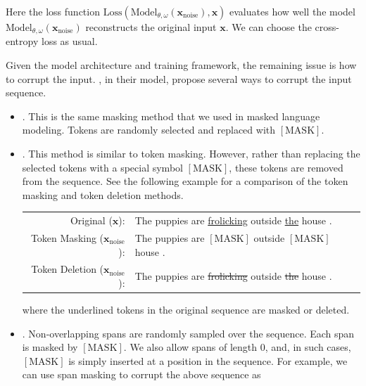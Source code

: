 \noindent Here the loss function $\mathrm{Loss}(\mathrm{Model}_{\theta,\omega}(\mathbf{x}_{\mathrm{noise}}),\mathbf{x})$ evaluates how well the model $\mathrm{Model}_{\theta,\omega}(\mathbf{x}_{\mathrm{noise}})$ reconstructs the original input $\mathbf{x}$. We can choose the cross-entropy loss as usual.

Given the model architecture and training framework, the remaining issue is how to corrupt the input. \citet{lewis-etal:2020bart}, in their  model, propose several ways to corrupt the input sequence.

\begin{itemize}
\item \vspace{0.5em} . This is the same masking method that we used in masked language modeling. Tokens are randomly selected and replaced with $\mathrm{[MASK]}$.
\item \vspace{0.3em} . This method is similar to token masking. However, rather than replacing the selected tokens with a special symbol $\mathrm{[MASK]}$, these tokens are removed from the sequence. See the following example for a comparison of the token masking and token deletion methods.

    \begin{center}
    \begingroup
    \renewcommand{\arraystretch}{1.2}
    \begin{tabular}{r l}
    Original ($\mathbf{x}$): & The puppies are \underline{frolicking} outside \underline{the} house . \\
    Token Masking ($\mathbf{x}_{\mathrm{noise}}$): & The puppies are $\mathrm{[MASK]}$ outside $\mathrm{[MASK]}$ house . \\
    Token Deletion ($\mathbf{x}_{\mathrm{noise}}$): & The puppies are {\color{gray} \sout{frolicking}} outside {\color{gray} \sout{the}} house .
    \end{tabular}
    \endgroup
    \end{center}

    \noindent where the underlined tokens in the original sequence are masked or deleted.

\item \vspace{0.3em} . Non-overlapping spans are randomly sampled over the sequence. Each span is masked by $\mathrm{[MASK]}$. We also allow spans of length 0, and, in such cases, $\mathrm{[MASK]}$ is simply inserted at a position in the sequence. For example, we can use span masking to corrupt the above sequence as


\end{itemize}
